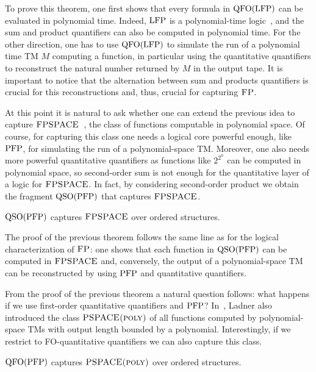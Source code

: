 To prove this theorem, 
one first shows that every formula in ${\rm QFO}({\rm LFP})$ can be evaluated in polynomial time. 
Indeed, ${\rm LFP}$ is a polynomial-time logic~\cite{I86,vardi1982complexity}, and the sum and product quantifiers can also be computed in polynomial time. 
For the other direction, one has to use ${\rm QFO}({\rm LFP})$ to simulate the run of a polynomial time TM $M$ computing a function, in particular using the quantitative quantifiers to reconstruct the natural number returned by $M$ in the output tape. 
It is important to notice that the alternation between sum and products quantifiers is crucial for this reconstructions and, thus, crucial for capturing $\text{\sc FP}$.

At this point it is natural to ask whether one can extend the previous idea to capture $\text{\sc FPSPACE}$~\cite{Ladner89}, the class of functions computable in polynomial space. 
Of course, for capturing this class one needs a logical core powerful enough, like ${\rm PFP}$, for simulating the run of a polynomial-space TM.
Moreover, 
one also needs more powerful quantitative quantifiers as functions like $2^{2^n}$ can be computed in polynomial space,
so second-order sum is not enough for the quantitative layer of a logic for $\text{\sc FPSPACE}$.
In fact, by considering second-order product we obtain the fragment ${\rm QSO}({\rm PFP})$ that 
captures $\text{\sc FPSPACE}$. 
\begin{theorem} \label{theo:capture-fpspace}
	${\rm QSO}({\rm PFP})$ captures $\text{\sc FPSPACE}$ over ordered structures.
\end{theorem}
The proof of the previous theorem follows the same line as for the logical characterization of $\text{\sc FP}$: one shows that each function in ${\rm QSO}({\rm PFP})$ can be computed in $\text{\sc FPSPACE}$ and, conversely, the output of a polynomial-space TM can be reconstructed by using ${\rm PFP}$ and quantitative quantifiers.

From the proof of the previous theorem a natural question follows: what happens if we use first-order quantitative quantifiers and ${\rm PFP}$?
In~\cite{Ladner89}, Ladner also introduced the class $\text{\sc PSPACE(poly)}$ of all functions computed by polynomial-space TMs 
with output length bounded by a polynomial.
Interestingly, if we restrict to FO-quantitative quantifiers we can also capture this class.
\begin{corollary} \label{cor:capture-fpspace-poly}
	${\rm QFO}({\rm PFP})$ captures $\text{\sc PSPACE(poly)}$ over ordered structures.
\end{corollary}

